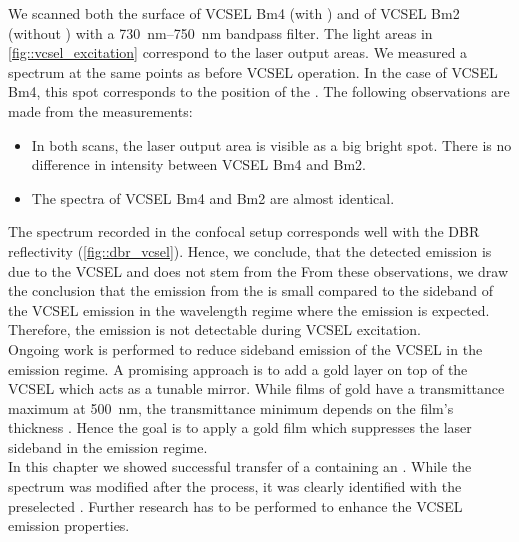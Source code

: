 	We scanned both the surface of VCSEL Bm4 (with \nd) and of VCSEL Bm2 (without \nd) with a \SIrange{730}{750}{nm} bandpass filter.
	The light areas in \cref{fig::vcsel_excitation} correspond to the laser output areas.
	We measured a spectrum at the same points as before VCSEL operation. 
	In the case of VCSEL Bm4, this spot corresponds to the position of the \siv.
	The following observations are made from the measurements:
	\begin{itemize}
		\item In both scans, the laser output area is visible as a big bright spot. There is no difference in intensity between VCSEL Bm4 and Bm2.
		\item The spectra of VCSEL Bm4 and Bm2 are almost identical.
	\end{itemize}
	
	The spectrum recorded in the confocal setup corresponds well with the DBR reflectivity (\cref{fig::dbr_vcsel}).
	Hence, we conclude, that the detected emission is due to the VCSEL and does not stem from the \siv{}
	From these observations, we draw the conclusion that the \fl emission from the \siv is small compared to the sideband of the VCSEL emission in the wavelength regime where the \siv emission is expected.
	Therefore, the \siv emission is not detectable during VCSEL excitation.
	\\
	Ongoing work is performed to reduce sideband emission of the VCSEL in the \siv emission regime.
	A promising approach is to add a gold layer on top of the VCSEL which acts as a tunable mirror.
	While films of gold have a transmittance maximum at \SI{500}{nm}, the transmittance minimum depends on the film's thickness \cite{Axelevitch2012}.
	Hence the goal is to apply a gold film which suppresses the laser sideband in the \siv emission regime.
	\\
	In this chapter we showed successful transfer of a \nd containing an \siv.
	While the \siv spectrum was modified after the \pp process, it was clearly identified with the preselected \siv.
	Further research has to be performed to enhance the VCSEL emission properties.

	